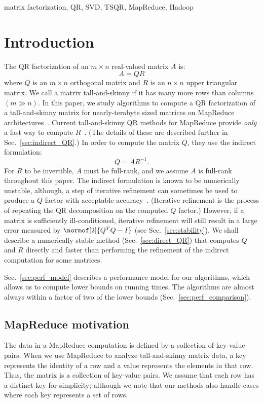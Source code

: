\documentclass[10pt, conference, compsocconf]{IEEEtran}
\begin{document}
\begin{IEEEkeywords}
matrix factorization, QR, SVD, TSQR, MapReduce, Hadoop
\end{IEEEkeywords}


\IEEEpeerreviewmaketitle

\section{Introduction}
The QR factorization of an $m \times n$ real-valued matrix $A$ is: 
\[ A = QR \]
where $Q$ is an $m \times n$ orthogonal matrix and $R$ is an $n \times n$ upper triangular matrix.  We call a matrix tall-and-skinny if it has many more rows than columns $(m \gg n)$.  In this paper, we study algorithms to compute a QR factorization of a tall-and-skinny matrix for nearly-terabyte sized matrices on MapReduce architectures~\cite{Dean2004-MapReduce}. Current tall-and-skinny QR methods for MapReduce provide \emph{only} a fast way to compute $R$~\cite{Constantine-2011-TSQR-MapReduce}. (The details of these are described further in Sec.~\ref{sec:indirect_QR}.)  In order to compute the matrix $Q$, they use the indirect formulation: 
\[ Q = AR^{-1}. \]
For $R$ to be invertible, $A$ must be full-rank, and we assume $A$ is full-rank throughout this paper.  The indirect formulation is known to be numerically unstable, although, a step of iterative refinement can sometimes be used to produce a $Q$ factor with acceptable accuracy~\cite{parlett1998}.  (Iterative refinement is the process of repeating the QR decomposition on the computed $Q$ factor.)  However, if a matrix is sufficiently ill-conditioned, iterative refinement will still result in a large error measured by $\normof[2]{Q^TQ - I}$ (see Sec.~\ref{sec:stability}).  We shall describe a numerically stable method (Sec.~\ref{sec:direct_QR}) that computes $Q$ and $R$ directly and faster than performing the refinement of the indirect computation for some matrices.

Sec.~\ref{sec:perf_model} describes a performance model for our algorithms, which allows us to compute lower bounds on running times.  The algorithms are almost always within a factor of two of the lower bounds (Sec.~\ref{sec:perf_comparison}).



\subsection{MapReduce motivation}


The data in a MapReduce computation is defined by a collection of key-value pairs. When we use MapReduce to analyze tall-and-skinny matrix data, a key represents the identity of a row and a value represents the elements in that row.  Thus, the matrix is a collection of key-value pairs.  We assume that each row has a distinct key for simplicity; although we note that our methods also handle cases where each key represents a set of rows.  
\end{document}
